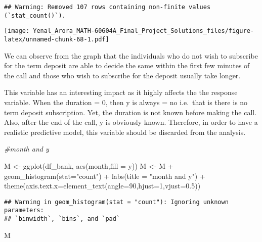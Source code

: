 \documentclass[
]{article}
\newenvironment{Shaded}{\begin{snugshade}}{\end{snugshade}}
\newcommand{\AttributeTok}[1]{\textcolor[rgb]{0.77,0.63,0.00}{#1}}
\newcommand{\CommentTok}[1]{\textcolor[rgb]{0.56,0.35,0.01}{\textit{#1}}}
\newcommand{\DecValTok}[1]{\textcolor[rgb]{0.00,0.00,0.81}{#1}}
\newcommand{\FloatTok}[1]{\textcolor[rgb]{0.00,0.00,0.81}{#1}}
\newcommand{\FunctionTok}[1]{\textcolor[rgb]{0.00,0.00,0.00}{#1}}
\newcommand{\NormalTok}[1]{#1}
\newcommand{\OtherTok}[1]{\textcolor[rgb]{0.56,0.35,0.01}{#1}}
\newcommand{\SpecialCharTok}[1]{\textcolor[rgb]{0.00,0.00,0.00}{#1}}
\newcommand{\StringTok}[1]{\textcolor[rgb]{0.31,0.60,0.02}{#1}}
\begin{document}
\begin{verbatim}
## Warning: Removed 107 rows containing non-finite values (`stat_count()`).
\end{verbatim}

\texttt{[image: Yenal\_Arora\_MATH-60604A\_Final\_Project\_Solutions\_files/figure-latex/unnamed-chunk-68-1.pdf]}

We can observe from the graph that the individuals who do not wish to
subscribe for the term deposit are able to decide the same within the
first few minutes of the call and those who wish to subscribe for the
deposit usually take longer.

This variable has an interesting impact as it highly affects the the
response variable. When the duration = 0, then y is always = no
i.e.~that is there is no term deposit subscription. Yet, the duration is
not known before making the call. Also, after the end of the call, y is
obviously known. Therefore, in order to have a realistic predictive
model, this variable should be discarded from the analysis.

\begin{Shaded}
\begin{Highlighting}[]
\CommentTok{\#month and y}

\NormalTok{M }\OtherTok{\textless{}{-}} \FunctionTok{ggplot}\NormalTok{(df\_bank, }\FunctionTok{aes}\NormalTok{(month,}\AttributeTok{fill =}\NormalTok{ y))}
\NormalTok{M }\OtherTok{\textless{}{-}}\NormalTok{ M }\SpecialCharTok{+} \FunctionTok{geom\_histogram}\NormalTok{(}\AttributeTok{stat=}\StringTok{"count"}\NormalTok{) }\SpecialCharTok{+} \FunctionTok{labs}\NormalTok{(}\AttributeTok{title =} \StringTok{"month and y"}\NormalTok{) }\SpecialCharTok{+}
  \FunctionTok{theme}\NormalTok{(}\AttributeTok{axis.text.x=}\FunctionTok{element\_text}\NormalTok{(}\AttributeTok{angle=}\DecValTok{90}\NormalTok{,}\AttributeTok{hjust=}\DecValTok{1}\NormalTok{,}\AttributeTok{vjust=}\FloatTok{0.5}\NormalTok{))}
\end{Highlighting}
\end{Shaded}

\begin{verbatim}
## Warning in geom_histogram(stat = "count"): Ignoring unknown parameters:
## `binwidth`, `bins`, and `pad`
\end{verbatim}

\begin{Shaded}
\begin{Highlighting}[]
\NormalTok{M}
\end{Highlighting}
\end{Shaded}
\end{document}
